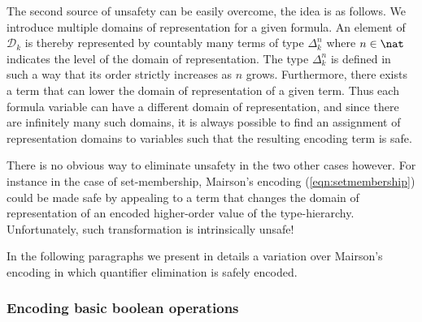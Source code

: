 The second source of unsafety can be easily overcome, the idea is as follows. We introduce multiple domains of representation for a given formula. An element of $\mathcal{D}_k$ is thereby represented by countably many terms of type $\Delta_k^n$ where $n\in\nat$ indicates the level of the domain of representation. The type $\Delta_k^n$ is defined in such a way that its order strictly increases as $n$ grows. Furthermore, there exists a term that can lower the domain of representation of a given term. Thus each formula variable can have a different domain of representation, and since there are infinitely many such domains, it is always possible to find an assignment of representation domains to variables such that the resulting encoding term is safe.

There is no obvious way to eliminate unsafety in the two other cases however. 
For instance in the case of set-membership, Mairson's encoding (\ref{eqn:setmembership}) could be made safe by appealing to a term that changes the domain of representation of an encoded higher-order value of the type-hierarchy. Unfortunately, such transformation is intrinsically unsafe!
\smallskip

In the following paragraphs we present in details a variation over Mairson's encoding in which quantifier elimination is safely encoded.

\subsubsection{Encoding basic boolean operations}

